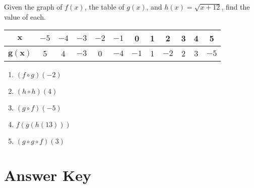Given the graph of $f(x)$, the table of $g(x)$, and $h(x)=\sqrt{x+12}$, find the value of each.  \newline\\
\begin{minipage}{0.35\textwidth}
\end{minipage}
\hspace{10pt}
\begin{minipage}{0.55\textwidth}
\begin{tabular}{|c|c|c|c|c|c|c|c|c|c|c|c|}
\hline 
    $\pmb{x}$ & $-5$ & $-4$ & $-3$ & $-2$ & $-1$ & 0 & 1 & 2 & 3 & 4 & 5 \\ \hline 
    $\pmb{g(x)}$ & 5 & 4 & $-3$ & 0 & $-4$ & $-1$ & 1 & $-2$ & 2 & 3 & $-5$ \\ \hline 
\end{tabular}
\end{minipage}
\begin{multicols}{5}
\begin{enumerate}   \setcounter{enumi}{\value{Review}}
	\item $(f \circ g)(-2)$
	\item  $(h \circ h)(4)$
	\item  $(g \circ f)(-5)$
	\item  $f(g(h(13)))$
	\item  $(g \circ g \circ f)(3)$
\end{enumerate}     \setcounter{Review}{\value{enumi}}	
\end{multicols}

\newpage

\section{Answer Key}

